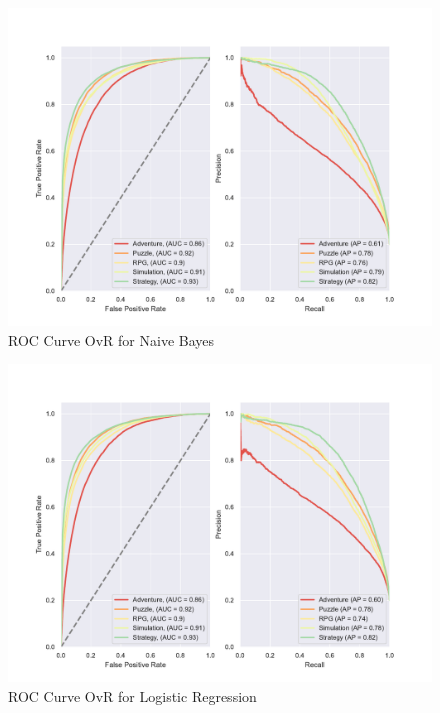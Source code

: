 \documentclass[11pt, a4paper]{article}
\begin{document}
\begin{figure}
    \centering
    \includegraphics[width=\textwidth]{data/results/plots/naive_bayes_roc}
    \caption{ROC Curve OvR for Naive Bayes}
    \label{fig:nb_roc_fig}
\end{figure}


\begin{figure}
    \centering
    \includegraphics[width=\textwidth]{data/results/plots/logistic_regression_roc}
    \caption{ROC Curve OvR for Logistic Regression}
    \label{fig:lr_roc_fig}
\end{figure}
\end{document}
